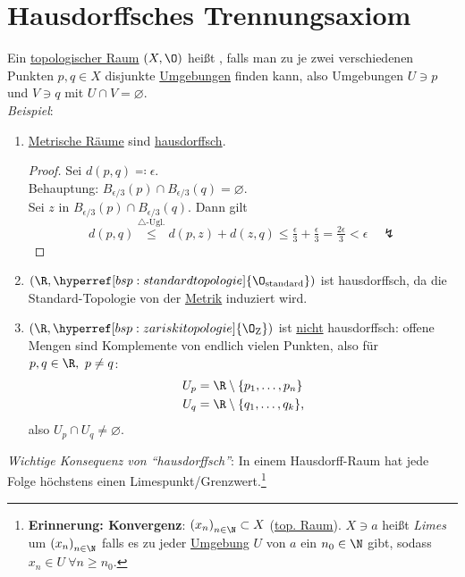 \section{Hausdorffsches Trennungsaxiom}
\begin{remark}\label{def:hausdorffsch}
  Ein \hyperref[def:topologie]{topologischer Raum} \( (X,\O) \) heißt , falls man zu je zwei verschiedenen Punkten \( p,q \in X \) disjunkte \hyperref[def:umgebung]{Umgebungen} finden kann, also Umgebungen \( U \ni p \) und \( V \ni q \) mit \( U \cap V = \varnothing \). \\
  \emph{Beispiel}:
  \begin{enumerate}
    \item \hyperref[def:metrischerRaum]{Metrische Räume} sind \hyperref[def:hausdorffsch]{hausdorffsch}.
    \begin{proof}
       Sei \( d(p,q) \eqqcolon \epsilon \). \\
       Behauptung: \( B_{\epsilon/3}(p) \cap B_{\epsilon/3}(q) = \varnothing \). \\
       Sei \( z \) in \( B_{\epsilon/3}(p) \cap B_{\epsilon/3}(q) \). Dann gilt
       \begin{equation*}
         d(p,q) \overset{\triangle\text{-Ugl.}}{\leq} d(p,z)+d(z,q) \leq \tfrac{\epsilon}{3} + \tfrac{\epsilon}{3} = \tfrac{2\epsilon}{3} < \epsilon \quad \lightning
       \end{equation*}
     \end{proof} 
    \item \( (\R, \hyperref[bsp:standardtopologie]{\O_\text{standard}}) \) ist hausdorffsch, da die Standard-Topologie von der \hyperref[def:metrik]{Metrik} induziert wird.
    \item \( (\R, \hyperref[bsp:zariskitopologie]{\O_\text{Z}}) \) ist \underline{nicht} hausdorffsch: offene Mengen sind Komplemente von endlich vielen Punkten, also für \( p, q \in \R, \ p \neq q \):
    \begin{align*}
      U_p &= \R \setminus \{ p_1, \dots, p_n \} \\
      U_q &= \R \setminus \{ q_1, \dots, q_k \}\text{,}
    \end{align*}
    also \( U_p \cap U_q \neq \varnothing \).
  \end{enumerate}
  \emph{Wichtige Konsequenz von ``hausdorffsch''}: In einem Hausdorff-Raum hat jede Folge höchstens einen Limespunkt/Grenzwert.\footnote{\textbf{Erinnerung: Konvergenz}\label{def:konvergenz}: \( {(x_n)}_{n \in \N} \subset X \) (\hyperref[def:topologie]{top. Raum}). \( X \ni a \) heißt \emph{Limes} um \( {(x_n)}_{n \in \N} \) falls es zu jeder \hyperref[def:umgebung]{Umgebung} \( U \) von \( a \) ein \( n_0 \in \N \) gibt, sodass \( x_n \in U \ \forall n \geq n_0 \).}
\end{remark}

